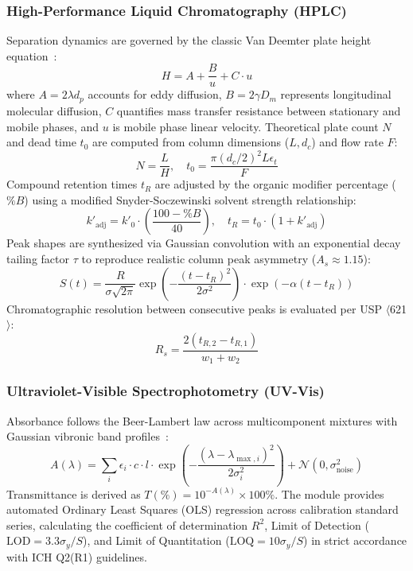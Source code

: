 \documentclass[final,5p,times,twocolumn]{elsarticle}
\begin{document}
\subsubsection{High-Performance Liquid Chromatography (HPLC)}
Separation dynamics are governed by the classic Van Deemter plate height equation~\cite{vandeemter1956longitudinal}:
\begin{equation}
H = A + \frac{B}{u} + C \cdot u
\end{equation}
where $A = 2 \lambda d_p$ accounts for eddy diffusion, $B = 2 \gamma D_m$ represents longitudinal molecular diffusion, $C$ quantifies mass transfer resistance between stationary and mobile phases, and $u$ is mobile phase linear velocity. Theoretical plate count $N$ and dead time $t_0$ are computed from column dimensions ($L, d_c$) and flow rate $F$:
\begin{equation}
N = \frac{L}{H}, \quad t_0 = \frac{\pi (d_c/2)^2 L \epsilon_t}{F}
\end{equation}
Compound retention times $t_R$ are adjusted by the organic modifier percentage ($\%B$) using a modified Snyder-Soczewinski solvent strength relationship:
\begin{equation}
k'_{\text{adj}} = k'_0 \cdot \left(\frac{100 - \%B}{40}\right), \quad t_R = t_0 \cdot (1 + k'_{\text{adj}})
\end{equation}
Peak shapes are synthesized via Gaussian convolution with an exponential decay tailing factor $\tau$ to reproduce realistic column peak asymmetry ($A_s \approx 1.15$):
\begin{equation}
S(t) = \frac{R}{\sigma \sqrt{2\pi}} \exp\left(-\frac{(t - t_R)^2}{2\sigma^2}\right) \cdot \exp\left(-\alpha (t - t_R)\right)
\end{equation}
Chromatographic resolution between consecutive peaks is evaluated per USP $\langle$621$\rangle$:
\begin{equation}
R_s = \frac{2 (t_{R,2} - t_{R,1})}{w_1 + w_2}
\end{equation}

\subsubsection{Ultraviolet-Visible Spectrophotometry (UV-Vis)}
Absorbance follows the Beer-Lambert law across multicomponent mixtures with Gaussian vibronic band profiles~\cite{skoog2017principles}:
\begin{equation}
A(\lambda) = \sum_{i} \epsilon_i \cdot c \cdot l \cdot \exp\left(-\frac{(\lambda - \lambda_{\max,i})^2}{2 \sigma_i^2}\right) + \mathcal{N}(0, \sigma_{\text{noise}}^2)
\end{equation}
Transmittance is derived as $T(\%) = 10^{-A(\lambda)} \times 100\%$. The module provides automated Ordinary Least Squares (OLS) regression across calibration standard series, calculating the coefficient of determination $R^2$, Limit of Detection ($\text{LOD} = 3.3 \sigma_y / S$), and Limit of Quantitation ($\text{LOQ} = 10 \sigma_y / S$) in strict accordance with ICH Q2(R1) guidelines.
\end{document}
